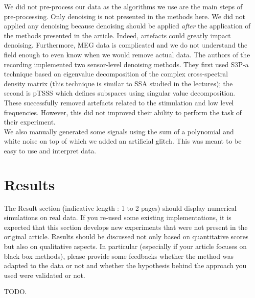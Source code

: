 \documentclass[11pt]{article}
\begin{document}
We did not pre-process our data as the algorithms we use are the main steps of pre-processing. Only denoising is not presented in the methods here. We did not applied any denoising because denoising should be applied \textit{after} the application of the methods presented in the article. Indeed, artefacts could greatly impact denoising. Furthermore, MEG data is complicated and we do not understand the field enough to even know when we would remove actual data. The authors of the recording implemented two sensor-level denoising methods. They first used S3P-a technique based on eigenvalue decomposition of the complex cross-spectral density matrix (this technique is similar to SSA studied in the lectures); the second is pTSSS which defines subspaces using singular value decomposition. These successfully removed artefacts related to the stimulation and low level frequencies. However, this did not improved their ability to perform the task of their experiment.\\

We also manually generated some signals using the sum of a polynomial and white noise on top of which we added an artificial glitch. This was meant to be easy to use and interpret data.\\ 

\section{Results}
The Result section (indicative length : 1 to 2 pages) should display numerical simulations on real data. If you re-used some existing implementations, it is expected that this section develops new experiments that were not present in the original article. Results should be discussed not only based on quantitative scores but also on qualitative aspects. In particular (especially if your article focuses on black box methods), please provide some feedbacks whether the method was adapted to the data or not and whether the hypothesis behind the approach you used were validated or not.

TODO.

\newpage

\printbibliography[heading=bibintoc]
\end{document}
